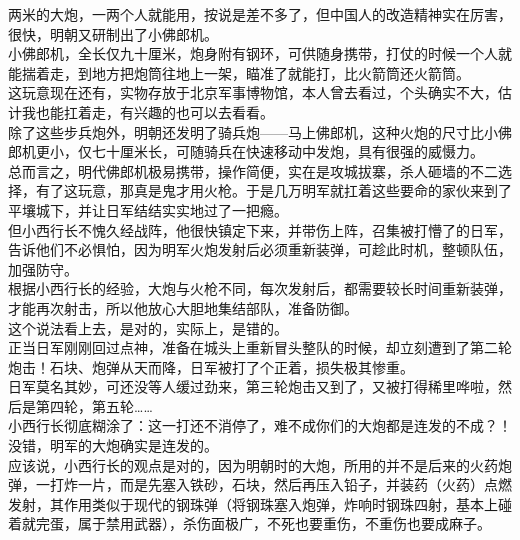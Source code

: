\begin{multicols}{\theparacolNo}
两米的大炮，一两个人就能用，按说是差不多了，但中国人的改造精神实在厉害，很快，明朝又研制出了小佛郎机。\\

小佛郎机，全长仅九十厘米，炮身附有钢环，可供随身携带，打仗的时候一个人就能揣着走，到地方把炮筒往地上一架，瞄准了就能打，比火箭筒还火箭筒。\\

这玩意现在还有，实物存放于北京军事博物馆，本人曾去看过，个头确实不大，估计我也能扛着走，有兴趣的也可以去看看。\\

除了这些步兵炮外，明朝还发明了骑兵炮——马上佛郎机，这种火炮的尺寸比小佛郎机更小，仅七十厘米长，可随骑兵在快速移动中发炮，具有很强的威慑力。\\

总而言之，明代佛郎机极易携带，操作简便，实在是攻城拔寨，杀人砸墙的不二选择，有了这玩意，那真是鬼才用火枪。于是几万明军就扛着这些要命的家伙来到了平壤城下，并让日军结结实实地过了一把瘾。\\

但小西行长不愧久经战阵，他很快镇定下来，并带伤上阵，召集被打懵了的日军，告诉他们不必惧怕，因为明军火炮发射后必须重新装弹，可趁此时机，整顿队伍，加强防守。\\

根据小西行长的经验，大炮与火枪不同，每次发射后，都需要较长时间重新装弹，才能再次射击，所以他放心大胆地集结部队，准备防御。\\

这个说法看上去，是对的，实际上，是错的。\\

正当日军刚刚回过点神，准备在城头上重新冒头整队的时候，却立刻遭到了第二轮炮击！石块、炮弹从天而降，日军被打了个正着，损失极其惨重。\\

日军莫名其妙，可还没等人缓过劲来，第三轮炮击又到了，又被打得稀里哗啦，然后是第四轮，第五轮……\\

小西行长彻底糊涂了：这一打还不消停了，难不成你们的大炮都是连发的不成？！\\

没错，明军的大炮确实是连发的。\\

应该说，小西行长的观点是对的，因为明朝时的大炮，所用的并不是后来的火药炮弹，一打炸一片，而是先塞入铁砂，石块，然后再压入铅子，并装药（火药）点燃发射，其作用类似于现代的钢珠弹（将钢珠塞入炮弹，炸响时钢珠四射，基本上碰着就完蛋，属于禁用武器），杀伤面极广，不死也要重伤，不重伤也要成麻子。\\


\end{multicols}
